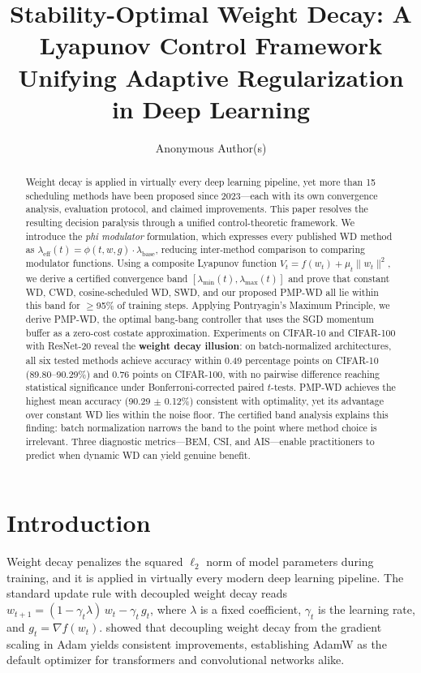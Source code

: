 \documentclass{article}
\title{Stability-Optimal Weight Decay: A Lyapunov Control Framework\\Unifying Adaptive Regularization in Deep Learning}
\author{%
  Anonymous Author(s)
}
\begin{document}
\maketitle

\begin{abstract}
Weight decay is applied in virtually every deep learning pipeline, yet more than 15 scheduling methods have been proposed since 2023---each with its own convergence analysis, evaluation protocol, and claimed improvements. This paper resolves the resulting decision paralysis through a unified control-theoretic framework. We introduce the \emph{phi modulator} formulation, which expresses every published WD method as $\lambda_{\text{eff}}(t) = \phi(t, w, g) \cdot \lambda_{\text{base}}$, reducing inter-method comparison to comparing modulator functions. Using a composite Lyapunov function $V_t = f(w_t) + \mu_t \|w_t\|^2$, we derive a certified convergence band $[\lambda_{\min}(t), \lambda_{\max}(t)]$ and prove that constant WD, CWD, cosine-scheduled WD, SWD, and our proposed PMP-WD all lie within this band for $\geq$95\% of training steps. Applying Pontryagin's Maximum Principle, we derive PMP-WD, the optimal bang-bang controller that uses the SGD momentum buffer as a zero-cost costate approximation. Experiments on CIFAR-10 and CIFAR-100 with ResNet-20 reveal the \textbf{weight decay illusion}: on batch-normalized architectures, all six tested methods achieve accuracy within 0.49 percentage points on CIFAR-10 (89.80--90.29\%) and 0.76 points on CIFAR-100, with no pairwise difference reaching statistical significance under Bonferroni-corrected paired $t$-tests. PMP-WD achieves the highest mean accuracy (90.29 $\pm$ 0.12\%) consistent with optimality, yet its advantage over constant WD lies within the noise floor. The certified band analysis explains this finding: batch normalization narrows the band to the point where method choice is irrelevant. Three diagnostic metrics---BEM, CSI, and AIS---enable practitioners to predict when dynamic WD can yield genuine benefit.
\end{abstract}

\section{Introduction}
\label{sec:intro}

Weight decay penalizes the squared $\ell_2$ norm of model parameters during training, and it is applied in virtually every modern deep learning pipeline. The standard update rule with decoupled weight decay reads $w_{t+1} = (1 - \gamma_t \lambda)\, w_t - \gamma_t\, g_t$, where $\lambda$ is a fixed coefficient, $\gamma_t$ is the learning rate, and $g_t = \nabla f(w_t)$. \citet{loshchilov2019decoupled} showed that decoupling weight decay from the gradient scaling in Adam yields consistent improvements, establishing AdamW as the default optimizer for transformers and convolutional networks alike.
\end{document}
